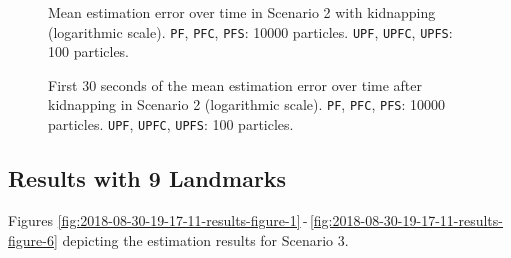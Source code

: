 \begin{figure}
	\centering
	\setlength{} 	
	\setlength\figurewidth{0.9\textheight}		
	\caption[Mean estimation error over time in Scenario 2 with kidnapping. \texttt{PF}, \texttt{PFC}, \texttt{PFS}: 10000 particles. \texttt{UPF}, \texttt{UPFC}, \texttt{UPFS}: 100 particles.]{Mean estimation error over time in Scenario 2 with kidnapping (logarithmic scale). \texttt{PF}, \texttt{PFC}, \texttt{PFS}: 10000 particles. \texttt{UPF}, \texttt{UPFC}, \texttt{UPFS}: 100 particles.}	
	\label{fig:2018-09-21-21-56-07-results-figure-6}			
\end{figure}

\begin{figure}
	\centering
	\setlength{} 	
	\setlength\figurewidth{0.9\textheight}		
	\caption[First 30 seconds of the mean estimation error over time after kidnapping in Scenario 2. \texttt{PF}, \texttt{PFC}, \texttt{PFS}: 10000 particles. \texttt{UPF}, \texttt{UPFC}, \texttt{UPFS}: 100 particles.]{First 30 seconds of the mean estimation error over time after kidnapping in Scenario 2 (logarithmic scale). \texttt{PF}, \texttt{PFC}, \texttt{PFS}: 10000 particles. \texttt{UPF}, \texttt{UPFC}, \texttt{UPFS}: 100 particles.}
	\label{fig:2018-09-21-21-56-07-results-figure-8}			
\end{figure}


\subsection{Results with 9 Landmarks}

Figures \ref{fig:2018-08-30-19-17-11-results-figure-1}\,-\,\ref{fig:2018-08-30-19-17-11-results-figure-6} depicting the estimation results for Scenario 3.



